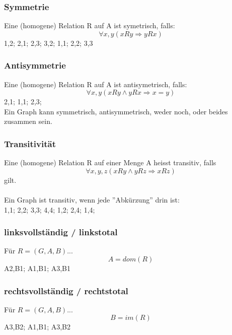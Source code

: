 \subsubsection{Symmetrie}
Eine (homogene) Relation R auf A ist symetrisch, falls:
\begin{equation}
    \forall{x,y} (xRy \Rightarrow yRx)
\end{equation}
{
1,2;
2,1;
2,3;
3,2;
1,1;
2,2;
3,3
}
\symetrisch{}
\subsubsection{Antisymmetrie}
Eine (homogene) Relation R auf A ist antisymetrisch, falls:
\begin{equation}
    \forall{x,y} (xRy \wedge yRx \Rightarrow x = y)
\end{equation}
{
2,1;
1,1;
2,3;
}
\antisymmetrisch{}
\\Ein Graph kann symmetrisch, antisymmetrisch, weder noch, oder beides zusammen sein.
\subsubsection{Transitivität} 
Eine (homogene) Relation R auf einer Menge A heisst transitiv,
falls
\begin{equation}
    \forall{x,y,z} (xRy \wedge yRz \Rightarrow xRz)
\end{equation}
gilt.\\\\
Ein Graph ist transitiv, wenn jede ''Abkürzung'' drin ist:\\
{
1,1;
2,2;
3,3;
4,4;
1,2;
2,4;
1,4;
}
\transitiv{}
\subsubsection{linksvollständig / linkstotal}
Für  $R = (G,A,B)$...
    \begin{equation}
        A = dom(R)
    \end{equation}
    {
    A2,B1;
    A1,B1;
    A3,B1
    }
\linkstotal{}
\subsubsection{rechtsvollständig / rechtstotal}
Für  $R = (G,A,B)$...
    \begin{equation}
        B = im(R)
    \end{equation}
        {
        A3,B2;
        A1,B1;
        A3,B2
        }
    \rechtstotal{}
